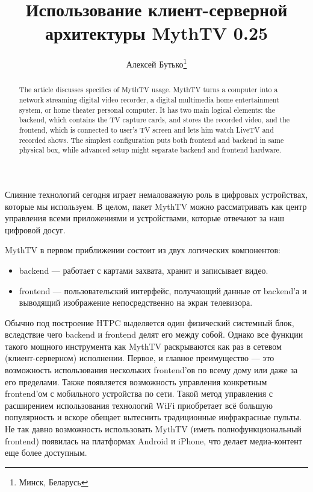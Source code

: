 \documentclass[10pt, a5paper]{article}
\begin{document}
\title{Использование клиент-серверной архитектуры MythTV 0.25}%

\author{Алексей Бутько\footnote{Минск, Беларусь}}
\maketitle

\begin{abstract}
The article discusses specifics of MythTV usage. MythTV turns a computer into a network streaming digital video recorder, a digital multimedia home entertainment system, or home theater personal computer. It has two main logical elements: the backend, which contains the TV capture cards, and stores the recorded video, and the frontend, which is connected to user's TV screen and lets him watch LiveTV and recorded shows. The simplest configuration puts both frontend and backend in same physical box, while advanced setup might separate backend and frontend hardware.
\end{abstract}


Слияние технологий сегодня играет немаловажную роль в цифровых устройствах, которые мы используем. В целом, пакет \linebreak MythTV можно рассматривать как центр управления всеми приложениями и устройствами, которые отвечают за наш цифровой досуг.

MythTV в первом приближении состоит из двух логических компонентов:

\begin{itemize}
  \item backend --- работает с картами захвата, хранит и записывает видео.
  \item frontend --- пользовательский интерфейс, получающий данные от backend'а и выводящий изображение непосредственно на экран телевизора.
\end{itemize}

Обычно под построение HTPC выделяется один физический системный блок, вследствие чего backend и frontend делят его между собой.  Однако все функции такого мощного инструмента как MythTV раскрываются как раз в сетевом (клиент-серверном) исполнении. Первое, и главное преимущество --- это возможность использования нескольких frontend'ов по всему дому или даже за его пределами. Также появляется возможность управления конкретным frontend'ом с мобильного устройства по сети. Такой метод управления с расширением использования технологий WiFi приобретает всё большую популярность и вскоре обещает вытеснить традиционные инфракрасные пульты. Не так давно возможность использовать MythTV (иметь полнофункциональный frontend)  появилась на платформах Android и iPhone, что делает медиа-контент еще более доступным.
\end{document}
